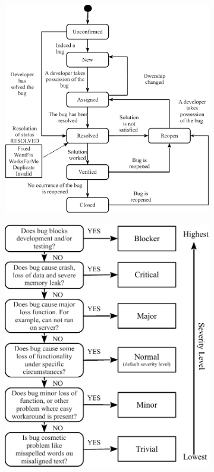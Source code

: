\begin{figure}[!htp]
  \begin{subfigure}{.49\textwidth}
    \centering
    \includegraphics[width=\textwidth]{figures/bug-report-life-cycle.pdf}
    \caption{}
    \label{fig:life-cycle-of-bug-report}
  \end{subfigure}\hfill
  \begin{subfigure}{.40\textwidth}
    \centering
    \includegraphics[width=\textwidth]{figures/bug-report-severity-levels.pdf}

\end{subfigure}
\end{figure}
